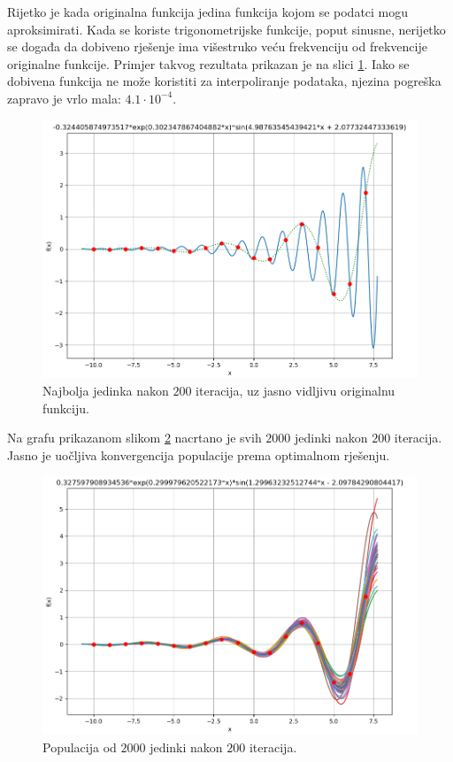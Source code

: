 \documentclass[times, utf8, seminar, numeric]{fer}
\begin{document}
Rijetko je kada originalna funkcija jedina funkcija kojom se podatci mogu aproksimirati.
Kada se koriste trigonometrijske funkcije, poput sinusne, nerijetko se događa da dobiveno rješenje ima višestruko veću frekvenciju od frekvencije originalne funkcije.
Primjer takvog rezultata prikazan je na slici \ref{Graph_HighFreq}.
Iako se dobivena funkcija ne može koristiti za interpoliranje podataka, njezina pogreška zapravo je vrlo mala: $4.1\cdot 10^{-4}$.

\begin{figure}[h]
	\centering
	\includegraphics[width=1\textwidth]{figures/Graph_HighFreq.png}
	\caption{\label{Graph_HighFreq}Najbolja jedinka nakon $200$ iteracija, uz jasno vidljivu originalnu funkciju.}
\end{figure}

Na grafu prikazanom slikom \ref{Graph_2000} nacrtano je svih $2000$ jedinki nakon $200$ iteracija.
Jasno je uočljiva konvergencija populacije prema optimalnom rješenju.

\begin{figure}[h]
	\centering
	\includegraphics[width=1\textwidth]{figures/Graph_2000.png}
	\caption{\label{Graph_2000}Populacija od $2000$ jedinki nakon $200$ iteracija.}
\end{figure}
\end{document}
